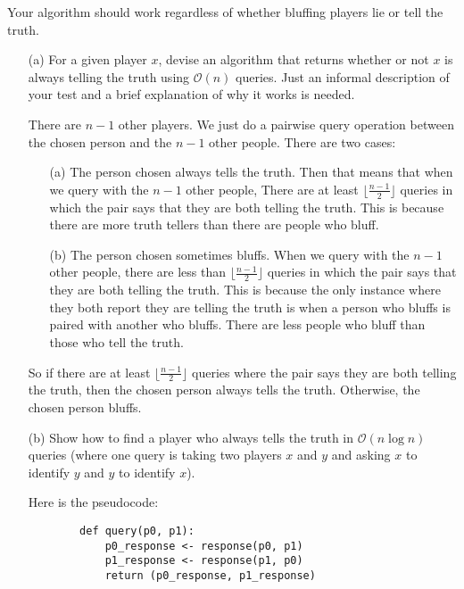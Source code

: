 \documentclass{article}
\begin{document}
Your algorithm should work regardless of whether bluffing players lie or tell the truth.
    \begin{itemize}
        \item [(a)] For a given player $x$, devise an algorithm that returns whether or not $x$ is always telling the truth using $\mathcal{O}(n)$ queries. Just an informal description of your test and a brief explanation of why it works is needed.
            \begin{answer}
                There are $n - 1$ other players. We just do a pairwise query operation between the chosen person and the $n - 1$ other people. There are two cases:
                    \begin{itemize}
                        \item [(a)] The person chosen always tells the truth. Then that means that when we query with the $n - 1$ other people, There are at least $\lfloor \frac{n - 1}{2} \rfloor$ queries in which the pair says that they are both telling the truth. This is because there are more truth tellers than there are people who bluff.

                        \item [(b)] The person chosen sometimes bluffs. When we query with the $n - 1$ other people, there are less than $\lfloor \frac{n - 1}{2} \rfloor$ queries in which the pair says that they are both telling the truth. This is because the only instance where they both report they are telling the truth is when a person who bluffs is paired with another who bluffs. There are less people who bluff than those who tell the truth.
                    \end{itemize}

                So if there are at least $\lfloor \frac{n - 1}{2} \rfloor$ queries where the pair says they are both telling the truth, then the chosen person always tells the truth. Otherwise, the chosen person bluffs.
            \end{answer}

        \item [(b)] Show how to find a player who always tells the truth in $\mathcal{O}(n \log{n})$ queries (where one query is taking two players $x$ and $y$ and asking $x$ to identify $y$ and $y$ to identify $x$).
            \begin{answer}
                Here is the pseudocode:
    \begin{verbatim}
        def query(p0, p1):
            p0_response <- response(p0, p1)
            p1_response <- response(p1, p0)
            return (p0_response, p1_response)


\end{verbatim}
\end{answer}
\end{itemize}
\end{document}

